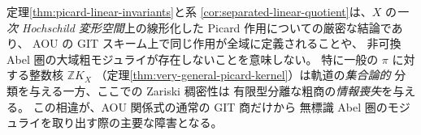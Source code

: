 \begin{remark}
\label{rem:picard-linear-scope}
定理\ref{thm:picard-linear-invariants}と系
\ref{cor:separated-linear-quotient}は、$X$ の\emph{一次 Hochschild
変形空間}上の線形化した Picard 作用についての厳密な結論であり、
AOU の GIT スキーム上で同じ作用が全域に定義されることや、
非可換 Abel 圏の大域粗モジュライが存在しないことを意味しない。
特に一般の $\pi$ に対する整数核 $\mathbb ZK_X$
（定理\ref{thm:very-general-picard-kernel}）は軌道の\emph{集合論的}
分類を与える一方、ここでの Zariski 稠密性は
有限型分離な粗商の\emph{情報喪失}を与える。
この相違が、AOU 関係式の通常の GIT 商だけから
無標識 Abel 圏のモジュライを取り出す際の主要な障害となる。
\end{remark}